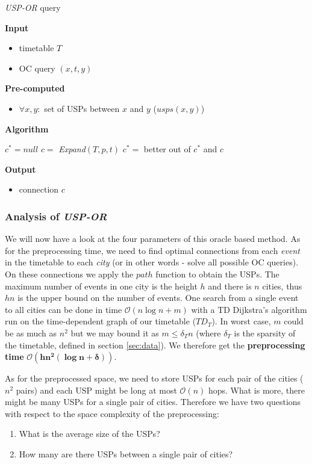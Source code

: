	\color{algcolor}
	\begin{algorithm}[H]
		\color{inalgcolor}
		\caption{\textit{USP-OR} query}
		\label{alg:uspor-query}
		\textbf{Input} 
		\begin{itemize}
			\item timetable $T$
			\item OC query $(x, t, y)$
		\end{itemize}
		\textbf{Pre-computed} 
		\begin{itemize}
			\item $\forall x, y:$ set of USPs between $x$ and $y$ ($usps(x, y)$)
		\end{itemize}
		\textbf{Algorithm}
		\begin{algorithmic}
			\STATE $c^{*} = null$
				\STATE $c =$ \textit{Expand}$(T, p, t)$
				\STATE $c^{*} =$ better out of $c^{*}$ and $c$
			\ENDFOR
		\end{algorithmic}
		\textbf{Output}
		\begin{itemize}
			\item connection $c$
		\end{itemize}
	\end{algorithm}
	\color{black}	
	
	\subsubsection{Analysis of \textit{USP-OR}}	
	
		\noindent We will now have a look at the four parameters of this oracle based method. As for the preprocessing time, we need to find optimal connections from each \textit{event} in the timetable to each \textit{city} (or in other words - solve all possible OC queries). On these connections we apply the $path$ function to obtain the USPs. The maximum number of events in one city is the height $h$ and there is $n$ cities, thus $hn$ is the upper bound on the number of events. One search from a single event to all cities can be done in time $\mathcal{O}(n \log n + m)$ with a TD Dijkstra's algorithm run on the time-dependent graph of our timetable ($TD_{T}$). In worst case, $m$ could be as much as $n^{2}$ but we may bound it as $m \leq \delta_{T} n$ (where $\delta_{T}$ is the sparsity of the timetable, defined in section \ref{sec:data}). We therefore get the \textbf{preprocessing time} $\bm{\mathcal{O}(hn^{2} (\log n + \delta))}$. 
		
		As for the preprocessed space, we need to store USPs for each pair of the cities ($n^{2}$ pairs) and each USP might be long at most $\mathcal{O}(n)$ hops. What is more, there might be many USPs for a single pair of cities. Therefore we have two questions with respect to the space complexity of the preprocessing:
		\begin{enumerate}
			\item What is the average size of the USPs?
			\item How many are there USPs between a single pair of cities?
		\end{enumerate}
		\hspace*{\fill}
		
